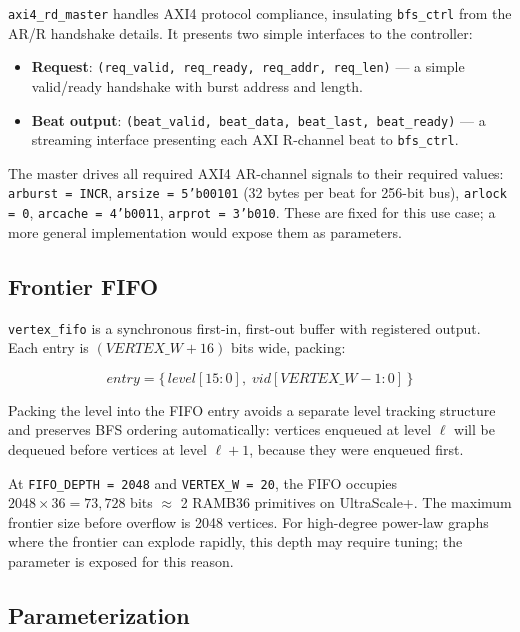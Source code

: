 \texttt{axi4\_rd\_master} handles AXI4 protocol compliance, insulating
\texttt{bfs\_ctrl} from the AR/R handshake details. It presents two simple interfaces
to the controller:

\begin{itemize}[leftmargin=*,itemsep=2pt]
\item \textbf{Request}: \texttt{(req\_valid, req\_ready, req\_addr, req\_len)} — a
  simple valid/ready handshake with burst address and length.
\item \textbf{Beat output}: \texttt{(beat\_valid, beat\_data, beat\_last, beat\_ready)}
  — a streaming interface presenting each AXI R-channel beat to \texttt{bfs\_ctrl}.
\end{itemize}

The master drives all required AXI4 AR-channel signals to their required values:
\texttt{arburst = INCR}, \texttt{arsize = 5'b00101} (32 bytes per beat for 256-bit
bus), \texttt{arlock = 0}, \texttt{arcache = 4'b0011}, \texttt{arprot = 3'b010}.
These are fixed for this use case; a more general implementation would expose them
as parameters.

\subsection{Frontier FIFO}

\texttt{vertex\_fifo} is a synchronous first-in, first-out buffer with registered
output. Each entry is $(\mathit{VERTEX\_W} + 16)$ bits wide, packing:

\begin{equation}
\mathit{entry} = \{\, \mathit{level}[15:0],\; \mathit{vid}[\mathit{VERTEX\_W}-1:0] \,\}
\end{equation}

Packing the level into the FIFO entry avoids a separate level tracking structure and
preserves BFS ordering automatically: vertices enqueued at level $\ell$ will be
dequeued before vertices at level $\ell+1$, because they were enqueued first.

At \texttt{FIFO\_DEPTH = 2048} and \texttt{VERTEX\_W = 20}, the FIFO occupies
$2048 \times 36 = 73{,}728$ bits $\approx$ 2 RAMB36 primitives on UltraScale+.
The maximum frontier size before overflow is 2048 vertices. For high-degree
power-law graphs where the frontier can explode rapidly, this depth may require
tuning; the parameter is exposed for this reason.

\subsection{Parameterization}

